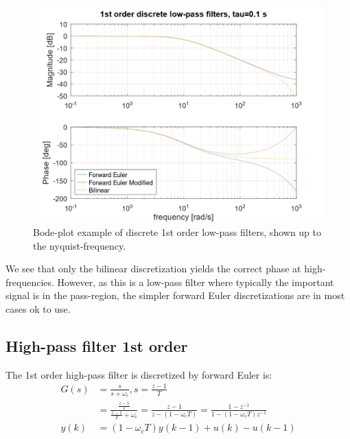 \documentclass[]{book}
\begin{document}
\begin{figure}
\includegraphics[width=1\linewidth]{images/filters/lpf_1st_disc} \caption{Bode-plot example of discrete 1st order low-pass filters, shown up to the nyquist-frequency.}\label{fig:unnamed-chunk-8}
\end{figure}

We see that only the bilinear discretization yields the correct phase at high-frequencies. However, as this is a low-pass filter where typically the important signal is in the pass-region, the simpler forward Euler discretizations are in most cases ok to use.

\hypertarget{high-pass-filter-1st-order-1}{%
\subsection{High-pass filter 1st order}\label{high-pass-filter-1st-order-1}}

The 1st order high-pass filter is discretized by forward Euler is:
\[
\begin{aligned}
G(s) &=  \frac{s}{s + \omega_c}, s=\frac{z-1}{T}  \\
&=  \frac{\frac{z-1}{T}}{\frac{z-1}{T} + \omega_c} =\frac{z-1}{z-(1- \omega_c T)} 
=\frac{1-z^{-1}}{1-(1- \omega_c T)z^{-1}}  \\
y(k) &=   (1 - \omega_c T)y(k-1)   +  u(k)-u(k-1) \\
\end{aligned}
\label{eq:dhpf1}
\]
\end{document}
